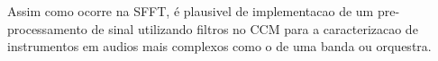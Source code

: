 \documentclass{article}
\begin{document}
	Assim como ocorre na SFFT, é plausivel de implementacao de um pre-processamento de sinal utilizando filtros no CCM para a caracterizacao de instrumentos em audios mais complexos como o de uma banda ou orquestra.






%
%
%
%
\end{document}
